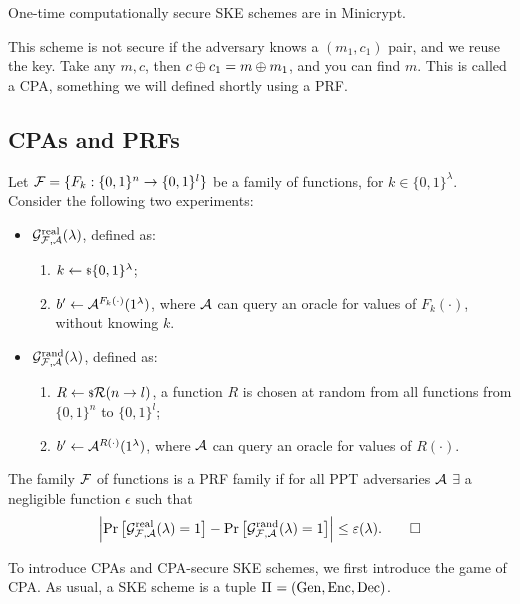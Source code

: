 \begin{corollary}
	One-time computationally secure \ac{SKE} schemes are in Minicrypt.
\end{corollary}

This scheme is not secure if the adversary knows a $(m_1, c_1)$ pair, and we reuse the key.
Take any $m, c$, then $c \oplus c_1 = m \oplus m_1$, and you can find $m$.
This is called a \ac{CPA}, something we will defined shortly using a \ac{PRF}.

\subsection{\aclp{CPA} and \aclp{PRF}}

\begin{definition}
	Let $\mathcal{F} = \{ F_k : \{0,1\}^{n} \to \{0,1\}^{l} \}$ be a family of functions, for $k \in \{0,1\}^{\lambda}$.
	Consider the following two experiments:
	\begin{itemize}
		\item $\mathcal{G}^{\scriptstyle \text{real}}_{\mathcal{F}, \mathcal{A}}(\lambda)$, defined as:
			\begin{enumerate}
				\item $k \leftarrow {\scriptstyle \$} {\{0,1\}^{\lambda}}$;
				\item $b' \leftarrow \mathcal{A}^{F_k(\cdot)}(1^{\lambda})$, where $\mathcal{A}$ can query an oracle for values of $F_k(\cdot)$, without knowing $k$.
			\end{enumerate}
		\item $\mathcal{G}^{\scriptstyle \text{rand}}_{\mathcal{F}, \mathcal{A}}(\lambda)$, defined as:
			\begin{enumerate}
				\item $R \leftarrow {\scriptstyle \$} {\mathcal{R}(n \to l)}$, \ie a function $R$ is chosen at random from all functions from $\{0,1\}^{n}$ to $\{0,1\}^{l}$;
				\item $b' \leftarrow \mathcal{A}^{R(\cdot)}(1^{\lambda})$, where $\mathcal{A}$ can query an oracle for values of $R(\cdot)$.
			\end{enumerate}
	\end{itemize}
	The family $\mathcal{F}$ of functions is a \ac{PRF} family if for all \ac{PPT} adversaries $\mathcal{A}$ $\exists$ a negligible function $\epsilon$ such that
	\begin{equation*}
		\left|{
			\mathop{\mathrm{Pr}}\limits_{} \left[ {\mathcal{G}^{\scriptstyle \text{real}}_{\mathcal{F}, \mathcal{A}}(\lambda) = 1} \right]
			-
			\mathop{\mathrm{Pr}}\limits_{} \left[ {\mathcal{G}^{\scriptstyle \text{rand}}_{\mathcal{F}, \mathcal{A}}(\lambda) = 1} \right]
		}\right|
		\le \varepsilon(\lambda). \qedhere
	\end{equation*}
\end{definition}

To introduce \acp{CPA} and \ac{CPA}-secure \ac{SKE} schemes, we first introduce the game of \ac{CPA}.
As usual, a \ac{SKE} scheme is a tuple $\Pi_{} = \left( \mathrm{Gen} , \allowbreak \mathrm{Enc} , \allowbreak \mathrm{Dec} \right)$.

